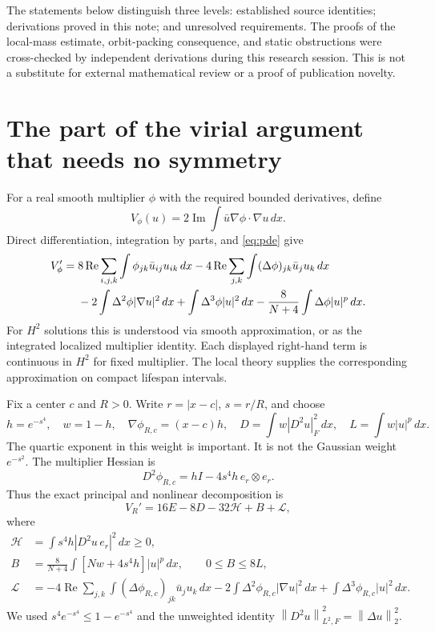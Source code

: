 \documentclass[11pt,a4paper]{article}
\theoremstyle{remark}\newtheorem{remark}[theorem]{Remark}
\newcommand{\dd}{\,dx}
\newcommand{\norm}[1]{\left\|#1\right\|}
\DeclareMathOperator{\Rea}{Re}
\DeclareMathOperator{\Ima}{Im}
\begin{document}
The statements below distinguish three levels: established source identities; derivations proved in this note; and unresolved requirements. The proofs of the local-mass estimate, orbit-packing consequence, and static obstructions were cross-checked by independent derivations during this research session. This is not a substitute for external mathematical review or a proof of publication novelty.

\section{The part of the virial argument that needs no symmetry}
For a real smooth multiplier $\phi$ with the required bounded derivatives, define
\[
 V_\phi(u)=2\Ima\int\bar u\nabla\phi\cdot\nabla u\dd.
\]
Direct differentiation, integration by parts, and \eqref{eq:pde} give
\begin{align}
 V_\phi'={}&8\Rea\sum_{i,j,k}\int\phi_{jk}\bar u_{ij}u_{ik}\dd
 -4\Rea\sum_{j,k}\int(\Delta\phi)_{jk}\bar u_j u_k\dd\notag\\
 &-2\int\Delta^2\phi|\nabla u|^2\dd
 +\int\Delta^3\phi|u|^2\dd
 -\frac8{N+4}\int\Delta\phi|u|^p\dd.\label{eq:virial}
\end{align}
For $H^2$ solutions this is understood via smooth approximation, or as the integrated localized multiplier identity. Each displayed right-hand term is continuous in $H^2$ for fixed multiplier. The local theory supplies the corresponding approximation on compact lifespan intervals.

Fix a center $c$ and $R>0$. Write $r=|x-c|$, $s=r/R$, and choose
\begin{equation}\label{eq:weights}
 h=e^{-s^4},\quad w=1-h,\quad \nabla\phi_{R,c}=(x-c)h,\quad
 D=\int w|D^2u|_F^2\dd,\quad L=\int w|u|^p\dd.
\end{equation}
The quartic exponent in this weight is important. It is not the Gaussian weight $e^{-s^2}$. The multiplier Hessian is
\[
 D^2\phi_{R,c}=hI-4s^4h\,e_r\otimes e_r.
\]
Thus the exact principal and nonlinear decomposition is
\begin{equation}\label{eq:ledger}
 V_R'=16E-8D-32\mathcal H+B+\mathcal L,
\end{equation}
where
\begin{align*}
 \mathcal H&=\int s^4h|D^2u\,e_r|^2\dd\ge0,\\
 B&=\frac8{N+4}\int[Nw+4s^4h]|u|^p\dd,\qquad 0\le B\le8L,\\
 \mathcal L&=-4\Rea\sum_{j,k}\int(\Delta\phi_{R,c})_{jk}\bar u_j u_k\dd
 -2\int\Delta^2\phi_{R,c}|\nabla u|^2\dd
 +\int\Delta^3\phi_{R,c}|u|^2\dd.
\end{align*}
We used $s^4e^{-s^4}\le1-e^{-s^4}$ and the unweighted identity
$\norm{D^2u}_{L^2,F}^2=\norm{\Delta u}_2^2$.
\end{document}
